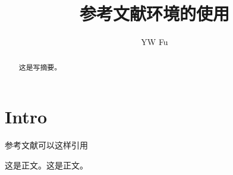 \documentclass[12pt,a4paper]{ctexart}
\author{YW Fu}
\title{参考文献环境的使用}
\begin{document}
	\maketitle 
	\begin{abstract}	%
		这是写摘要。
	\end{abstract}	
	\section{Intro}
	参考文献可以这样引用
	
	
	这是正文。这是正文\cite{KandR}。

	\newpage
	
\end{document}

